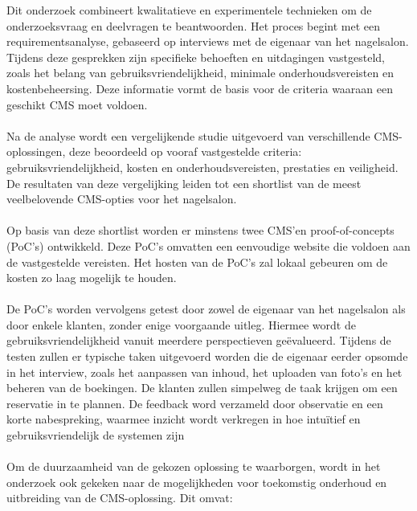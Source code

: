 \noindent
Dit onderzoek combineert kwalitatieve en experimentele technieken om de onderzoeksvraag en deelvragen te beantwoorden. Het proces begint met een requirementsanalyse, gebaseerd op interviews met de eigenaar van het nagelsalon. Tijdens deze gesprekken zijn specifieke behoeften en uitdagingen vastgesteld, zoals het belang van gebruiksvriendelijkheid, minimale onderhoudsvereisten en kostenbeheersing. Deze informatie vormt de basis voor de criteria waaraan een geschikt CMS moet voldoen.
\\ \\
Na de analyse wordt een vergelijkende studie uitgevoerd van verschillende CMS-oplossingen, deze beoordeeld op vooraf vastgestelde criteria: gebruiksvriendelijkheid, kosten en onderhoudsvereisten, prestaties en veiligheid. De resultaten van deze vergelijking leiden tot een shortlist van de meest veelbelovende CMS-opties voor het nagelsalon.
\\ \\
Op basis van deze shortlist worden er minstens twee CMS’en proof-of-concepts (PoC’s) ontwikkeld. Deze PoC's omvatten een eenvoudige website die voldoen aan de vastgestelde vereisten. Het hosten van de PoC's zal lokaal gebeuren om de kosten zo laag mogelijk te houden.
\\ \\
De PoC’s worden vervolgens getest door zowel de eigenaar van het nagelsalon als door enkele klanten, zonder enige voorgaande uitleg. Hiermee wordt de gebruiksvriendelijkheid vanuit meerdere perspectieven geëvalueerd. Tijdens de testen zullen er typische taken uitgevoerd worden die de eigenaar eerder opsomde in het interview, zoals het aanpassen van inhoud, het uploaden van foto’s en het beheren van de boekingen. De klanten zullen simpelweg de taak krijgen om een reservatie in te plannen. De feedback word verzameld door observatie en een korte nabespreking, waarmee inzicht wordt verkregen in hoe intuïtief en gebruiksvriendelijk de systemen zijn
\\ \\
Om de duurzaamheid van de gekozen oplossing te waarborgen, wordt in het onderzoek ook gekeken naar de mogelijkheden voor toekomstig onderhoud en uitbreiding van de CMS-oplossing. Dit omvat:
